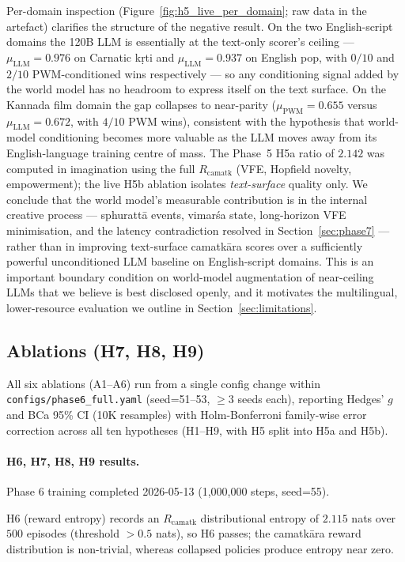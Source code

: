 \documentclass[journal,onecolumn,11pt]{IEEEtran}
\begin{document}
Per-domain inspection (Figure~\ref{fig:h5_live_per_domain}; raw data in the
 artefact) clarifies the
structure of the negative result.
On the two English-script domains the 120B LLM is essentially at the
text-only scorer's ceiling --- $\mu_{\text{LLM}} = 0.976$ on Carnatic kṛti
and $\mu_{\text{LLM}} = 0.937$ on English pop, with $0/10$ and $2/10$
PWM-conditioned wins respectively --- so any conditioning signal added by
the world model has no headroom to express itself on the text surface.
On the Kannada film domain the gap collapses to near-parity
($\mu_{\text{PWM}} = 0.655$ versus $\mu_{\text{LLM}} = 0.672$, with $4/10$
PWM wins), consistent with the hypothesis that world-model conditioning
becomes more valuable as the LLM moves away from its English-language
training centre of mass.
The Phase~5 H5a ratio of $2.142$ was computed in imagination using the
full $R_{\text{camatk}}$ (VFE, Hopfield novelty, empowerment); the live
H5b ablation isolates \emph{text-surface} quality only.
We conclude that the world model's measurable contribution is in the
internal creative process --- sphurattā events, vimarśa state, long-horizon
VFE minimisation, and the latency contradiction resolved in
Section~\ref{sec:phase7} --- rather than in improving text-surface camatkāra
scores over a sufficiently powerful unconditioned LLM baseline on
English-script domains.
This is an important boundary condition on world-model augmentation of
near-ceiling LLMs that we believe is best disclosed openly, and it
motivates the multilingual, lower-resource evaluation we outline in
Section~\ref{sec:limitations}.

\subsection{Ablations (H7, H8, H9)}

All six ablations (A1--A6) run from a single config change within
\texttt{configs/phase6\_full.yaml} (seed=51--53, $\geq 3$ seeds each),
reporting Hedges' $g$ and BCa 95\% CI (10K resamples) with Holm-Bonferroni
family-wise error correction across all ten hypotheses (H1--H9, with H5
split into H5a and H5b).

\paragraph{H6, H7, H8, H9 results.}
Phase 6 training completed 2026-05-13 (1{,}000{,}000 steps, seed=55).

H6 (reward entropy) records an $R_{\text{camatk}}$ distributional entropy
of $2.115$ nats over $500$ episodes (threshold $> 0.5$ nats), so H6
passes; the camatkāra reward distribution is non-trivial, whereas
collapsed policies produce entropy near zero.
\end{document}
